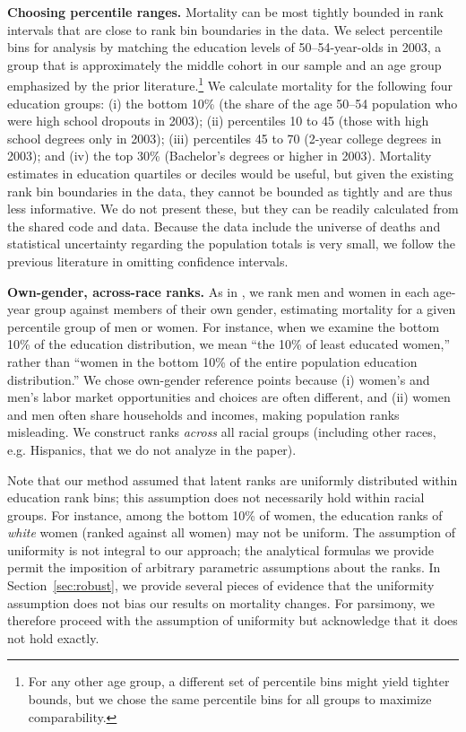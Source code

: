 \documentclass[12pt,letterpaper]{article}
\numberwithin{equation}{section}
\begin{document}
\textbf{Choosing percentile ranges.} Mortality can be most tightly bounded in rank intervals that are close to rank bin boundaries in the data. We select percentile bins for analysis by matching the education levels of 50--54-year-olds in 2003, a group that is approximately the middle cohort in our sample and an age group emphasized by the prior literature.\footnote{For any other age group, a different set of percentile bins might yield tighter bounds, but we chose the same percentile bins for all groups to maximize comparability.} We calculate mortality for the following four education groups: (i) the bottom 10\% (the share of the age 50--54 population who were high school dropouts in 2003); (ii) percentiles 10 to 45 (those with high school degrees only in 2003); (iii) percentiles 45 to 70 (2-year college degrees in 2003); and (iv) the top 30\% (Bachelor's degrees or higher in 2003). Mortality estimates in education quartiles or deciles would be useful, but given the existing rank bin boundaries in the data, they cannot be bounded as tightly and are thus less informative. We do not present these, but they can be readily calculated from the shared code and data. Because the data include the universe of deaths and statistical uncertainty regarding the population totals is very small, we follow the previous literature in omitting confidence intervals.

\textbf{Own-gender, across-race ranks.} As in \citet{Chetty2016b}, we
rank men and women in each age-year group against members of their own
gender, estimating mortality for a given percentile group of men or
women. For instance, when we examine the bottom 10\% of the education
distribution, we mean ``the 10\% of least educated women,'' rather
than ``women in the bottom 10\% of the entire population education
distribution.'' We chose own-gender reference points because (i) women's and men's labor market opportunities and choices are often different, and (ii) women and men often share households and incomes, making population ranks misleading. We construct ranks \textit{across} all racial groups (including other races, e.g. Hispanics, that we do not analyze in the paper). 

Note that our method assumed that latent ranks are uniformly
distributed within education rank bins; this assumption does not
necessarily hold within racial groups. For instance, among the bottom
10\% of women, the education ranks of \textit{white} women (ranked
against all women) may not be uniform. The assumption of uniformity is
not integral to our approach; the analytical formulas we provide
permit the imposition of arbitrary parametric assumptions about the
ranks. In Section~\ref{sec:robust}, we provide several pieces of
evidence that the uniformity assumption does not bias our results on
mortality changes. For parsimony, we therefore proceed with the
assumption of uniformity but acknowledge that it does not hold
exactly. 
\end{document}
